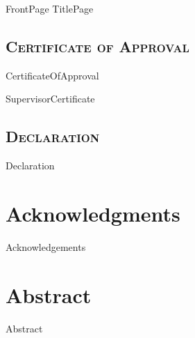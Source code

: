 \documentclass{report}
\begin{document}
 

	{FrontPage}
	\BlankPage
	{TitlePage}
	\BlankPage
	
	
	\section*{\Large \scshape \filcenter Certificate of Approval}
	{CertificateOfApproval}
	\BlankPage
	
	{SupervisorCertificate}
	\BlankPage
	
	\section*{ \Large \scshape \filcenter\scshape Declaration }
	{Declaration}
	\BlankPage	
	
	
	\chapter*{Acknowledgments}
	{Acknowledgements}
	\BlankPage
		
	
	\chapter*{Abstract}
	{Abstract}
	\BlankPage
 	
\end{document}
